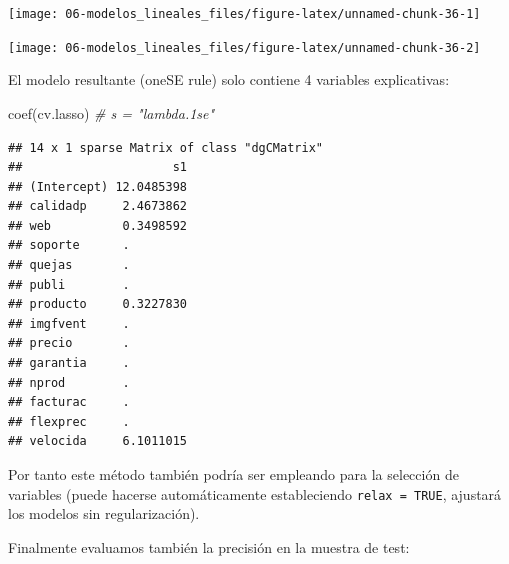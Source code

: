 \documentclass[
]{book}
\newenvironment{Shaded}{\begin{snugshade}}{\end{snugshade}}
\newcommand{\AttributeTok}[1]{\textcolor[rgb]{0.77,0.63,0.00}{#1}}
\newcommand{\CommentTok}[1]{\textcolor[rgb]{0.56,0.35,0.01}{\textit{#1}}}
\newcommand{\ConstantTok}[1]{\textcolor[rgb]{0.00,0.00,0.00}{#1}}
\newcommand{\DecValTok}[1]{\textcolor[rgb]{0.00,0.00,0.81}{#1}}
\newcommand{\FloatTok}[1]{\textcolor[rgb]{0.00,0.00,0.81}{#1}}
\newcommand{\FunctionTok}[1]{\textcolor[rgb]{0.00,0.00,0.00}{#1}}
\newcommand{\NormalTok}[1]{#1}
\newcommand{\SpecialCharTok}[1]{\textcolor[rgb]{0.00,0.00,0.00}{#1}}
\newcommand{\StringTok}[1]{\textcolor[rgb]{0.31,0.60,0.02}{#1}}
\theoremstyle{break}
\theoremstyle{definition}
\theoremstyle{definition}
\theoremstyle{definition}
\theoremstyle{definition}
\theoremstyle{remark}
\begin{document}
\begin{center}\texttt{[image: 06-modelos\_lineales\_files/figure-latex/unnamed-chunk-36-1]} \end{center}

\begin{Shaded}
\end{Shaded}

\begin{center}\texttt{[image: 06-modelos\_lineales\_files/figure-latex/unnamed-chunk-36-2]} \end{center}

El modelo resultante (oneSE rule) solo contiene 4 variables explicativas:

\begin{Shaded}
\begin{Highlighting}[]
\FunctionTok{coef}\NormalTok{(cv.lasso) }\CommentTok{\# s = "lambda.1se"}
\end{Highlighting}
\end{Shaded}

\begin{verbatim}
## 14 x 1 sparse Matrix of class "dgCMatrix"
##                     s1
## (Intercept) 12.0485398
## calidadp     2.4673862
## web          0.3498592
## soporte      .        
## quejas       .        
## publi        .        
## producto     0.3227830
## imgfvent     .        
## precio       .        
## garantia     .        
## nprod        .        
## facturac     .        
## flexprec     .        
## velocida     6.1011015
\end{verbatim}

Por tanto este método también podría ser empleando para la selección de variables (puede hacerse automáticamente estableciendo \texttt{relax\ =\ TRUE}, ajustará los modelos sin regularización).

Finalmente evaluamos también la precisión en la muestra de test:
\end{document}
